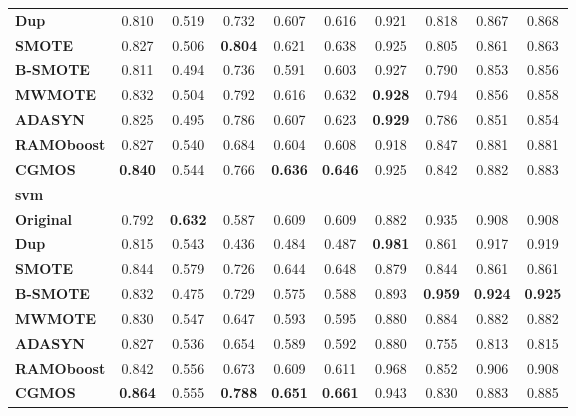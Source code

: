\documentclass{iitthesis}
\begin{document}
\begin{table}[]
\begin{center}
{\begin{tabular}{lccccccccc}
\multicolumn{1}{l}{\textbf{Dup}} & 0.810 & 0.519 & 0.732 & 0.607 & 0.616 & 0.921 & 0.818 & 0.867 & 0.868  \\ 
\multicolumn{1}{l}{\textbf{SMOTE}} & 0.827 & 0.506 & \textbf{0.804} & 0.621 & 0.638 & 0.925 & 0.805 & 0.861 & 0.863  \\ 
\multicolumn{1}{l}{\textbf{B-SMOTE}} & 0.811 & 0.494 & 0.736 & 0.591 & 0.603 & 0.927 & 0.790 & 0.853 & 0.856  \\
\multicolumn{1}{l}{\textbf{MWMOTE}} & 0.832 & 0.504 & 0.792 & 0.616 & 0.632 & \textbf{0.928} & 0.794 & 0.856 & 0.858  \\ 
\multicolumn{1}{l}{\textbf{ADASYN}} & 0.825 & 0.495 & 0.786 & 0.607 & 0.623 & \textbf{0.929} & 0.786 & 0.851 & 0.854  \\ 
\multicolumn{1}{l}{\textbf{RAMOboost}} & 0.827 & 0.540 & 0.684 & 0.604 & 0.608 & 0.918 & 0.847 & 0.881 & 0.881  \\ 
\multicolumn{1}{l}{\textbf{CGMOS}} & \textbf{0.840} & 0.544 & 0.766 & \textbf{0.636} & \textbf{0.646} & 0.925 & 0.842 & 0.882 & 0.883  \\ 
\hline                    
\multicolumn{1}{l}{\textbf{svm}} & & \multicolumn{4}{c}{} & \multicolumn{4}{c}{}  \\               
\hline                     
\multicolumn{1}{l}{\textbf{Original}} & 0.792 & \textbf{0.632} & 0.587 & 0.609 & 0.609 & 0.882 & 0.935 & 0.908 & 0.908  \\
\multicolumn{1}{l}{\textbf{Dup}} & 0.815 & 0.543 & 0.436 & 0.484 & 0.487 & \textbf{0.981} & 0.861 & 0.917 & 0.919  \\ 
\multicolumn{1}{l}{\textbf{SMOTE}} & 0.844 & 0.579 & 0.726 & 0.644 & 0.648 & 0.879 & 0.844 & 0.861 & 0.861  \\
\multicolumn{1}{l}{\textbf{B-SMOTE}} & 0.832 & 0.475 & 0.729 & 0.575 & 0.588 & 0.893 & \textbf{0.959} & \textbf{0.924} & \textbf{0.925}  \\
\multicolumn{1}{l}{\textbf{MWMOTE}} & 0.830 & 0.547 & 0.647 & 0.593 & 0.595 & 0.880 & 0.884 & 0.882 & 0.882  \\
\multicolumn{1}{l}{\textbf{ADASYN}} & 0.827 & 0.536 & 0.654 & 0.589 & 0.592 & 0.880 & 0.755 & 0.813 & 0.815  \\
\multicolumn{1}{l}{\textbf{RAMOboost}} & 0.842 & 0.556 & 0.673 & 0.609 & 0.611 & 0.968 & 0.852 & 0.906 & 0.908  \\ 
\multicolumn{1}{l}{\textbf{CGMOS}} & \textbf{0.864} & 0.555 & \textbf{0.788} & \textbf{0.651} & \textbf{0.661} & 0.943 & 0.830 & 0.883 & 0.885  \\ 

\end{tabular}}
\end{center}
\end{table}
\end{document}
